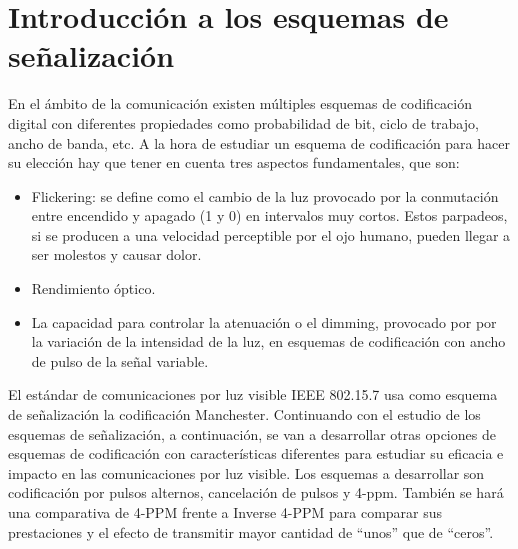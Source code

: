 
\label{chp:App}
\minitoc

\section{Introducción a los esquemas de señalización}

En el ámbito de la comunicación existen múltiples esquemas de codificación digital con diferentes propiedades como 
probabilidad de bit, ciclo de trabajo, ancho de banda, etc. A la hora de estudiar un esquema de codificación para hacer 
su elección hay que tener en cuenta tres aspectos fundamentales, que son: \cite{arte}
\begin{itemize}
    \item Flickering: se define como el cambio de la luz provocado por la conmutación entre encendido 
y apagado (1 y 0) en intervalos muy cortos. 
Estos parpadeos, si se producen a una velocidad perceptible por el ojo humano, pueden llegar a ser molestos y causar dolor. 
    \item Rendimiento óptico.
    \item La capacidad para controlar la atenuación o el dimming, provocado por por la variación de la intensidad de la luz, 
    en esquemas de codificación con ancho de pulso de la señal variable. 
\end{itemize} 

El estándar de comunicaciones por luz visible IEEE 802.15.7 usa como esquema de señalización la codificación Manchester. 
Continuando con el estudio de los esquemas de señalización,
a continuación, se van a desarrollar otras opciones de esquemas de codificación con características diferentes
para estudiar su eficacia e impacto en las comunicaciones por luz visible.
Los esquemas a desarrollar son codificación por pulsos alternos, cancelación de pulsos y 4-ppm. También se hará una 
comparativa de 4-PPM frente a Inverse 4-PPM para comparar sus prestaciones y el efecto de transmitir mayor cantidad 
de ``unos'' que de ``ceros''.

